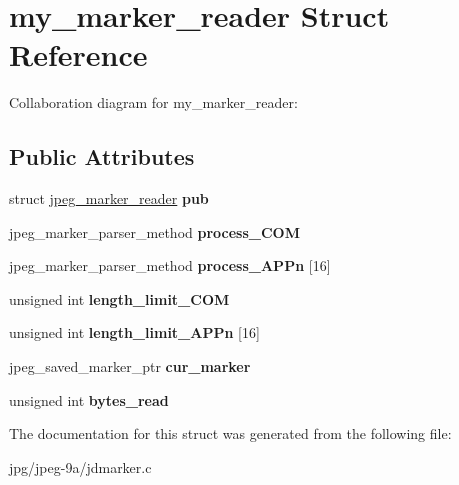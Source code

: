 \hypertarget{structmy__marker__reader}{\section{my\+\_\+marker\+\_\+reader Struct Reference}
\label{structmy__marker__reader}
}


Collaboration diagram for my\+\_\+marker\+\_\+reader\+:
\subsection*{Public Attributes}
\begin{DoxyCompactItemize}
\item 
\hypertarget{structmy__marker__reader_ac0d8a24c85575d304ef4383e8f6ca5fc}{struct \hyperlink{structjpeg__marker__reader}{jpeg\+\_\+marker\+\_\+reader} {\bfseries pub}}\label{structmy__marker__reader_ac0d8a24c85575d304ef4383e8f6ca5fc}

\item 
\hypertarget{structmy__marker__reader_a5e10e69e117d23840f04d54e7a3cdde5}{jpeg\+\_\+marker\+\_\+parser\+\_\+method {\bfseries process\+\_\+\+C\+O\+M}}\label{structmy__marker__reader_a5e10e69e117d23840f04d54e7a3cdde5}

\item 
\hypertarget{structmy__marker__reader_a3a466da71db30199ab019a03960013cc}{jpeg\+\_\+marker\+\_\+parser\+\_\+method {\bfseries process\+\_\+\+A\+P\+Pn} \mbox{[}16\mbox{]}}\label{structmy__marker__reader_a3a466da71db30199ab019a03960013cc}

\item 
\hypertarget{structmy__marker__reader_aa17938db027aceb539d880b78841826e}{unsigned int {\bfseries length\+\_\+limit\+\_\+\+C\+O\+M}}\label{structmy__marker__reader_aa17938db027aceb539d880b78841826e}

\item 
\hypertarget{structmy__marker__reader_a029e9f21bc02a21c1a26d3c0d7158098}{unsigned int {\bfseries length\+\_\+limit\+\_\+\+A\+P\+Pn} \mbox{[}16\mbox{]}}\label{structmy__marker__reader_a029e9f21bc02a21c1a26d3c0d7158098}

\item 
\hypertarget{structmy__marker__reader_a861ef3029e1690b4345a8ceb3975e8df}{jpeg\+\_\+saved\+\_\+marker\+\_\+ptr {\bfseries cur\+\_\+marker}}\label{structmy__marker__reader_a861ef3029e1690b4345a8ceb3975e8df}

\item 
\hypertarget{structmy__marker__reader_ada1054ee3408bbfcacdddb27af8d9754}{unsigned int {\bfseries bytes\+\_\+read}}\label{structmy__marker__reader_ada1054ee3408bbfcacdddb27af8d9754}

\end{DoxyCompactItemize}


The documentation for this struct was generated from the following file\+:\begin{DoxyCompactItemize}
\item 
jpg/jpeg-\/9a/jdmarker.\+c\end{DoxyCompactItemize}
